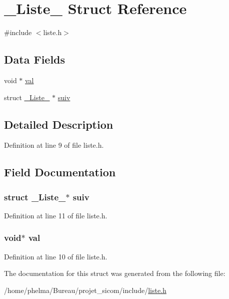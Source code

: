 \hypertarget{struct___liste__}{\section{\-\_\-\-Liste\-\_\- Struct Reference}
\label{struct___liste__}
}


{\ttfamily \#include $<$liste.\-h$>$}

\subsection*{Data Fields}
\begin{DoxyCompactItemize}
\item 
void $\ast$ \hyperlink{struct___liste___ab03f36f103bdec81305fd301f1f93885}{val}
\item 
struct \hyperlink{struct___liste__}{\-\_\-\-Liste\-\_\-} $\ast$ \hyperlink{struct___liste___a7b04951b6e3b6b7a5f1bff3f54f57218}{suiv}
\end{DoxyCompactItemize}


\subsection{Detailed Description}


Definition at line 9 of file liste.\-h.



\subsection{Field Documentation}
\hypertarget{struct___liste___a7b04951b6e3b6b7a5f1bff3f54f57218}{
\subsubsection[{suiv}]{\setlength{\rightskip}{0pt plus 5cm}struct {\bf \-\_\-\-Liste\-\_\-}$\ast$ suiv}}\label{struct___liste___a7b04951b6e3b6b7a5f1bff3f54f57218}


Definition at line 11 of file liste.\-h.

\hypertarget{struct___liste___ab03f36f103bdec81305fd301f1f93885}{
\subsubsection[{val}]{\setlength{\rightskip}{0pt plus 5cm}void$\ast$ val}}\label{struct___liste___ab03f36f103bdec81305fd301f1f93885}


Definition at line 10 of file liste.\-h.



The documentation for this struct was generated from the following file\-:\begin{DoxyCompactItemize}
\item 
/home/phelma/\-Bureau/projet\-\_\-sicom/include/\hyperlink{liste_8h}{liste.\-h}\end{DoxyCompactItemize}
